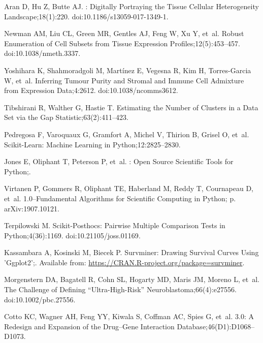 \documentclass[10pt,letterpaper]{article}
\begin{document}
\begin{thebibliography}{10}
	Aran D, Hu Z, Butte AJ.
	: Digitally Portraying the Tissue Cellular Heterogeneity
	Landscape;18(1):220.
	\newblock doi:{10.1186/s13059-017-1349-1}.
	
	Newman AM, Liu CL, Green MR, Gentles AJ, Feng W, Xu Y, et~al.
	\newblock Robust Enumeration of Cell Subsets from Tissue Expression
	Profiles;12(5):453--457.
	\newblock doi:{10.1038/nmeth.3337}.
	
	Yoshihara K, Shahmoradgoli M, Martínez E, Vegesna R, Kim H, Torres-Garcia W,
	et~al.
	\newblock Inferring Tumour Purity and Stromal and Immune Cell Admixture from
	Expression Data;4:2612.
	\newblock doi:{10.1038/ncomms3612}.
	
	Tibshirani R, Walther G, Hastie T.
	\newblock Estimating the Number of Clusters in a Data Set via the Gap
	Statistic;63(2):411--423.
	
	Pedregosa F, Varoquaux G, Gramfort A, Michel V, Thirion B, Grisel O, et~al.
	\newblock Scikit-Learn: Machine Learning in Python;12:2825--2830.
	
	Jones E, Oliphant T, Peterson P, et~al.
	: {{Open}} Source Scientific Tools for {{Python}};.
	
	Virtanen P, Gommers R, Oliphant TE, Haberland M, Reddy T, Cournapeau D, et~al.
	 1.0–{{Fundamental Algorithms}} for {{Scientific
			Computing}} in {{Python}}; p. arXiv:1907.10121.
	
	Terpilowski M.
	\newblock Scikit-Posthocs: {{Pairwise}} Multiple Comparison Tests in
	{{Python}};4(36):1169.
	\newblock doi:{10.21105/joss.01169}.
	
	Kassambara A, Kosinski M, Biecek P.
	\newblock Survminer: Drawing Survival Curves Using 'Ggplot2';.
	\newblock Available from: \url{https://CRAN.R-project.org/package=survminer}.
	
	Morgenstern DA, Bagatell R, Cohn SL, Hogarty MD, Maris JM, Moreno L, et~al.
	\newblock The Challenge of Defining “Ultra-High-Risk”
	Neuroblastoma;66(4):e27556.
	\newblock doi:{10.1002/pbc.27556}.
	
	Cotto KC, Wagner AH, Feng YY, Kiwala S, Coffman AC, Spies G, et~al.
	 3.0: A Redesign and Expansion of the Drug–Gene
	Interaction Database;46(D1):D1068--D1073.
	

\end{thebibliography}
\end{document}
